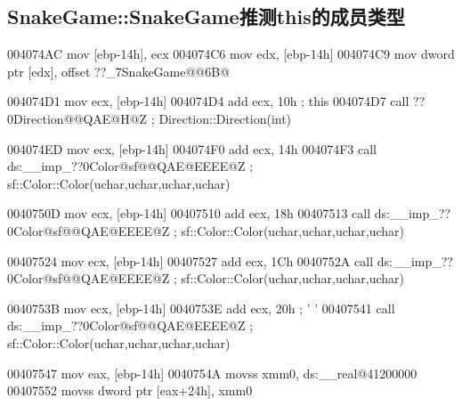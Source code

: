 \documentclass[AutoFakeBold,AutoFakeSlant]{beamer}
\begin{document}
	\subsection{SnakeGame::SnakeGame推测this的成员类型}
	\begin{frame}[fragile]
		\tiny
		\linespread{0.5} \selectfont
		\begin{x86asmcode}
004074AC mov     [ebp-14h], ecx
004074C6 mov     edx, [ebp-14h]
004074C9 mov     dword ptr [edx], offset ??_7SnakeGame@@6B@

004074D1 mov     ecx, [ebp-14h]
004074D4 add     ecx, 10h        ; this
004074D7 call    ??0Direction@@QAE@H@Z ; Direction::Direction(int)

004074ED mov     ecx, [ebp-14h]
004074F0 add     ecx, 14h
004074F3 call    ds:__imp_??0Color@sf@@QAE@EEEE@Z ; sf::Color::Color(uchar,uchar,uchar,uchar)

0040750D mov     ecx, [ebp-14h]
00407510 add     ecx, 18h
00407513 call    ds:__imp_??0Color@sf@@QAE@EEEE@Z ; sf::Color::Color(uchar,uchar,uchar,uchar)

00407524 mov     ecx, [ebp-14h]
00407527 add     ecx, 1Ch
0040752A call    ds:__imp_??0Color@sf@@QAE@EEEE@Z ; sf::Color::Color(uchar,uchar,uchar,uchar)

0040753B mov     ecx, [ebp-14h]
0040753E add     ecx, 20h ; ' '
00407541 call    ds:__imp_??0Color@sf@@QAE@EEEE@Z ; sf::Color::Color(uchar,uchar,uchar,uchar)

00407547 mov     eax, [ebp-14h]
0040754A movss   xmm0, ds:__real@41200000
00407552 movss   dword ptr [eax+24h], xmm0\end{x86asmcode}
    \end{frame}
	
\end{document}
